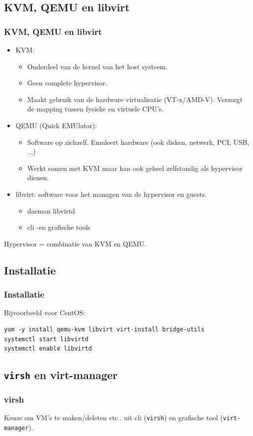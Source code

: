 \subsection {KVM, QEMU en libvirt}
\begin{styleframe}
    \frametitle{KVM, QEMU en libvirt}
\begin{itemize}
	\item KVM:
		\begin{itemize}
			\item Onderdeel van de kernel van het host systeem.
			\item Geen complete hypervisor.
			\item Maakt gebruik van de hardware virtualisatie (VT-x/AMD-V). Verzorgt de mapping tussen fysieke en virtuele CPU's.
		\end{itemize}
	\item QEMU (Quick EMUlator):
		\begin{itemize}
			\item Software op zichzelf. Emuleert hardware (ook disken, netwerk, PCI, USB, ...)
			\item Werkt samen met KVM maar kan ook geheel zelfstandig als hypervisor dienen.
		\end{itemize}
	\item libvirt: software voor het managen van de hypervisor en guests.
		\begin{itemize}
			\item daemon libvirtd
			\item cli -en grafische tools
		\end{itemize}
\end{itemize}
Hypervisor = combinatie van KVM en QEMU.
\end{styleframe}

\subsection {Installatie}
\begin{styleframefrag}
    \frametitle{Installatie}
Bijvoorbeeld voor CentOS:
\scriptsize
\begin{verbatim}
yum -y install qemu-kvm libvirt virt-install bridge-utils
systemctl start libvirtd
systemctl enable libvirtd
\end{verbatim}
\end{styleframefrag}

\subsection {{\tt virsh} en virt-manager}
\begin{styleframe}
    \frametitle{virsh}
Keuze om VM's te maken/deleten etc.. uit cli ({\tt virsh}) en grafische tool ({\tt virt-manager}).
\end{styleframe}

